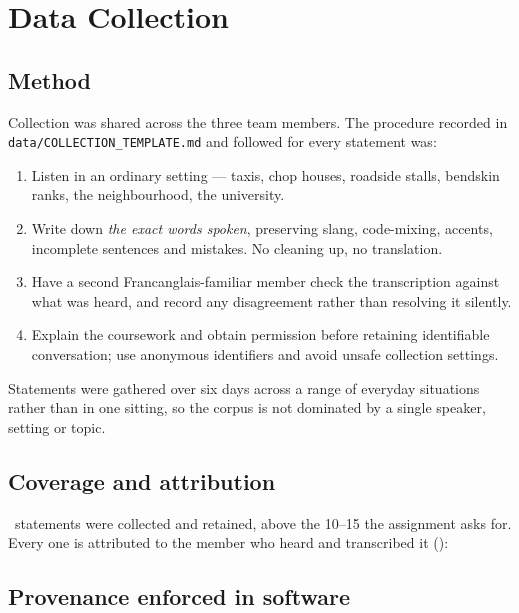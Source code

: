 \section{Data Collection}\label{sec:data}

\subsection{Method}

Collection was shared across the three team members. The procedure recorded in
\texttt{data/\allowbreak COLLECTION\_\allowbreak TEMPLATE.md} and followed for every
statement was:

\begin{enumerate}[leftmargin=1.4em, itemsep=0.15em]
  \item Listen in an ordinary setting --- taxis, chop houses, roadside stalls, bendskin
        ranks, the neighbourhood, the university.
  \item Write down \emph{the exact words spoken}, preserving slang, code-mixing, accents,
        incomplete sentences and mistakes. No cleaning up, no translation.
  \item Have a second Francanglais-familiar member check the transcription against what
        was heard, and record any disagreement rather than resolving it silently.
  \item Explain the coursework and obtain permission before retaining identifiable
        conversation; use anonymous identifiers and avoid unsafe collection settings.
\end{enumerate}

Statements were gathered over six days across a range of everyday situations rather than
in one sitting, so the corpus is not dominated by a single speaker, setting or topic.

\subsection{Coverage and attribution}

\CorpusTotal\ statements were collected and retained, above the 10--15 the assignment asks
for. Every one is attributed to the member who heard and transcribed it ():

\begin{center}

\end{center}

\subsection{Provenance enforced in software}

